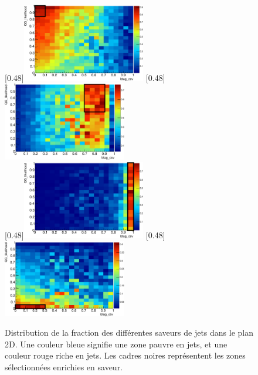 \begin{figure}[p!] \centering
    [0.48\textwidth]{\includegraphics[width=0.48\textwidth]{chapitre4/figs/flavor/2DTaggingPlan_uds_ptPhot_100_800_stageM2.pdf}}
    [0.48\textwidth]{\includegraphics[width=0.48\textwidth]{chapitre4/figs/flavor/2DTaggingPlan_c_ptPhot_100_800_stageM2.pdf}} \\
    [0.48\textwidth]{\includegraphics[width=0.48\textwidth]{chapitre4/figs/flavor/2DTaggingPlan_b_ptPhot_100_800_stageM2.pdf}}
    [0.48\textwidth]{\includegraphics[width=0.48\textwidth]{chapitre4/figs/flavor/2DTaggingPlan_g_ptPhot_100_800_stageM2.pdf}}
    \caption{Distribution de la fraction des différentes saveurs de jets dans le plan 2D. Une couleur bleue signifie une zone pauvre en jets, et une couleur rouge riche en jets. Les cadres noires représentent les zones sélectionnées enrichies en saveur.}
    \label{fig:2d_zones}
\end{figure}

